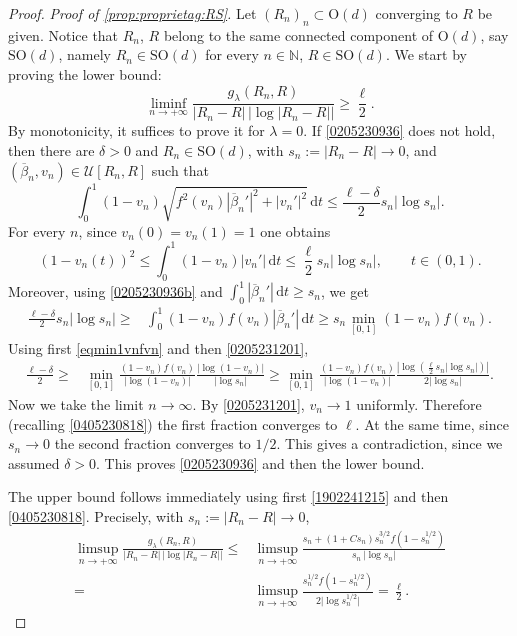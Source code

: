 \documentclass[10pt,a4paper]{amsart}
\newcommand\N{\mathbb{N}}
\newcommand{\On}{\mathrm{O}(d)}
\newcommand{\SOn}{\mathrm{SO}(d)}
\newcommand\calU{\mathcal{U}}
\newcommand\dt{{\,\mathrm{d}t}}
\newcommand{\ol}{\overline}
\begin{document}
\begin{proof}
\noindent \textit{Proof of \ref{prop:proprietag:RS}.} Let $(R_n)_n\subset \On$ converging to $R$ be given. Notice that $R_n$, $R$ belong to the same connected component of $\On$, say $\SOn$, namely $R_n \in \SOn$ for every $n\in\N$, $R\in \SOn$.   We start by proving the lower bound:
\begin{equation}\label{0205230936}
	\liminf_{n\to +\infty}\frac{g_\lambda(R_n, R)}{|R_n-R| \,\big|\log |R_n-R|\big|}\geq \frac{\ell}{2}.
\end{equation}
By monotonicity, it suffices to prove it for $\lambda=0$.
If \eqref{0205230936} does not hold, then there are $\delta>0$ and 
$R_n\in \SOn$, with $s_n:=|R_n-R|\to0$,
and
$(\ol\beta_n,v_n)\in\calU[R_n,R]$ such that
\begin{equation}\label{0205230936b}
\int_0^1 (1-v_n) \sqrt{f^2(v_n) |\ol\beta_n'|^2+|v_n'|^2} \dt \le
 \frac{\ell-\delta}{2} s_n |\log s_n|.
\end{equation}
For every $n$, since
$v_n(0)=v_n(1)=1$ one obtains
\begin{equation}\label{0205231201}
{(1-v_{n}(t))^2} \le
\int_0^1  (1-v_n)|v_n'|\dt \le
 \frac{\ell}{2} s_n |\log s_n|, \qquad t\in (0,1).
\end{equation}
Moreover, using \eqref{0205230936b} and
$\int_0^1  |\ol\beta_n'| \dt \geq s_n$, we get
\begin{equation}\label{eqmin1vnfvn}
 \begin{split}
 \frac{\ell-\delta}{2} s_n |\log s_n|\ge&
\int_0^1 (1-v_n) f(v_n) |\ol\beta_n'|\dt
\ge s_n \min_{[0,1]} (1-v_n) f(v_n).
\end{split}
\end{equation}
Using first \eqref{eqmin1vnfvn} and then
\eqref{0205231201},
\begin{equation}
\begin{split}
 \frac{\ell-\delta}{2} \ge&
 \min_{[0,1]}
\frac{(1-v_n) f(v_n)}{|\log(1-v_n)|}
\frac{|\log(1-v_n)|} {|\log s_n|}
\ge\min_{[0,1]}
\frac{(1-v_n) f(v_n)}
{|\log(1-v_n)|}
\frac{{|\log (\frac\ell2 s_n |\log s_n|)|}}{ 2|\log s_n|}.
\end{split}\end{equation}
Now we take the limit $n\to\infty$.
By \eqref{0205231201},
$v_n\to1$ uniformly. Therefore
(recalling \eqref{0405230818})
the first fraction converges to $\ell$.
At the same time, since $s_n\to0$ the second fraction converges to $1/2$.
This gives a contradiction, since we assumed $\delta>0$.
This proves
\eqref{0205230936} and then the lower bound.


The upper bound follows immediately using first \eqref{1902241215} and then
\eqref{0405230818}. Precisely, with $s_n:=|R_n-R|\to0$,
\[
\begin{split}
	\limsup_{n\to +\infty}  \frac{g_\lambda( R_n, R)}{|R_n-R| \,\big|\log |R_n-R|\big|}
	\leq&
	\limsup_{n\to +\infty}\frac{s_n +
	(1+Cs_n)
	s_n^{3/2} f(1-s_n^{1/2 })}
	{s_n \,\big|\log s_n\big|}
	\\  =&
	\limsup_{n\to +\infty}\frac{s_n^{1/2}
	f(1-s_n^{1/2})}
	{2\big|\log s_n^{1/2}\big|} =
	\frac{\ell}{2}.
\end{split}
\]


\end{proof}
\end{document}
